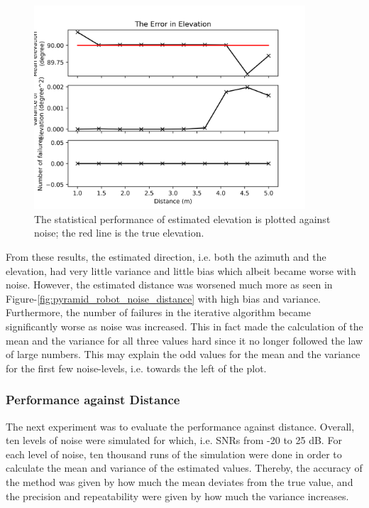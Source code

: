 \documentclass[notitlepage]{report}
\begin{document}
\begin{figure}[H]
\includegraphics[width=0.9\textwidth]{../Python/pyramid_robot/noise/elevation.png}
\centering
\caption{The statistical performance of estimated elevation is plotted against noise; the red line is the true elevation.}
\label{fig:pyramid_robot_noise_elevation}
\centering
\end{figure}

From these results, the estimated direction, i.e. both the azimuth and the elevation, had very little variance and little bias which albeit became worse with noise. However, the estimated distance was worsened much more as seen in Figure-\ref{fig:pyramid_robot_noise_distance} with high bias and variance. Furthermore, the number of failures in the iterative algorithm became significantly worse as noise was increased. This in fact made the calculation of the mean and the variance for all three values hard since it no longer followed the law of large numbers. This may explain the odd values for the mean and the variance for the first few noise-levels, i.e. towards the left of the plot.

\subsubsection{Performance against Distance}

The next experiment was to evaluate the performance against distance. Overall, ten levels of noise were simulated for which, i.e. SNRs from -20 to 25 \si{dB}. For each level of noise, ten thousand runs of the simulation were done in order to calculate the mean and variance of the estimated values. Thereby, the accuracy of the method was given by how much the mean deviates from the true value, and the precision and repeatability were given by how much the variance increases.
\end{document}
